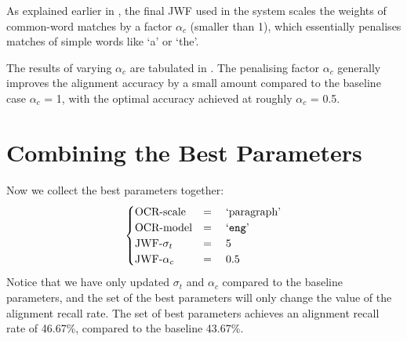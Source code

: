 As explained earlier in , the final JWF used in the system scales the weights of common-word matches by a factor $\alpha_c$ (smaller than 1), which essentially penalises matches of simple words like `a' or `the'. 

The results of varying $\alpha_c$ are tabulated in . The penalising factor $\alpha_c$ generally improves the alignment accuracy by a small amount compared to the baseline case $\alpha_c$ = 1, with the optimal accuracy achieved at roughly $\alpha_c$ = 0.5.

\section{Combining the Best Parameters}

Now we collect the best parameters together:
\begin{equation*}
    \begin{cases}
        \text{OCR-scale} &=\quad \text{`paragraph'} \\
        \text{OCR-model} &=\quad \text{`\texttt{eng}'} \\
        \text{JWF-}\sigma_t &=\quad 5 \\
        \text{JWF-}\alpha_c &=\quad 0.5
    \end{cases}
\end{equation*}
Notice that we have only updated $\sigma_t$ and $\alpha_c$ compared to the baseline parameters, and the set of the best parameters will only change the value of the alignment recall rate. The set of best parameters achieves an alignment recall rate of 46.67\%, compared to the baseline 43.67\%.


